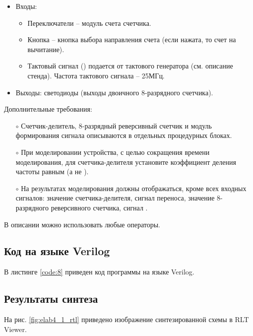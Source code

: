 \begin{itemize}
	\item Входы:
		\begin{itemize}
			\item Переключатели  -- модуль счета счетчика.
			\item Кнопка  -- кнопка выбора направления счета (если  нажата, то счет на вычитание).
			\item Тактовый сигнал () подается от тактового генератора (см. описание стенда). Частота тактового сигнала – 25МГц.
		\end{itemize}
	\item Выходы: светодиоды  (выходы двоичного 8-разрядного счетчика).
\end{itemize}

Дополнительные требования:
\begin{itemize}
	\item[$\circ$] Счетчик-делитель, 8-разрядный реверсивный счетчик и модуль формирования сигнала  описываются в отдельных процедурных блоках.
	\item[$\circ$] При моделировании устройства, с целью сокращения времени моделирования, для счетчика-делителя установите коэффициент деления частоты равным  (а не ).
	\item[$\circ$] На результатах моделирования должны отображаться, кроме всех входных сигналов: значение счетчика-делителя, сигнал переноса, значение 8-разрядного реверсивного счетчика, сигнал .
\end{itemize}

В описании можно использовать любые операторы.

\subsection{Код на языке Verilog}

В листинге \ref{code:8} приведен код программы на языке Verilog.



\subsection{Результаты синтеза}

На рис. \ref{fig:elab4_1_rtl} приведено изображение синтезированной схемы в RLT Viewer.

